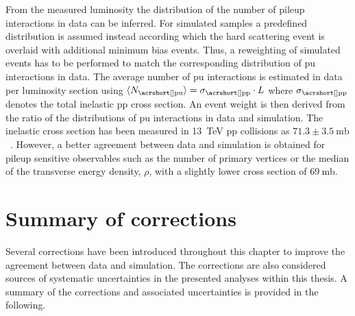From the measured luminosity the distribution of the number of pileup interactions in data can be inferred. For simulated samples a predefined distribution is assumed instead according which the hard scattering event is overlaid with additional minimum bias events. Thus, a reweighting of simulated events has to be performed to match the corresponding distribution of \gls{pu} interactions in data. 
The average number of \gls{pu} interactions is estimated in data per luminosity section using $\langle N_\mathrm{\gls{pu}}\rangle=\sigma_\mathrm{\gls{pp}}\cdot L$ where $\sigma_\mathrm{\gls{pp}}$ denotes the total inelastic \gls{pp} cross section. An event weight is then derived from the ratio of the distributions of \gls{pu} interactions in data and simulation. The inelastic cross section has been measured in 13~TeV \gls{pp} collisions as $71.3\pm3.5~\mathrm{mb}$~\cite{CMS-PAS-FSQ-15-005}. However, a better agreement between data and simulation is obtained for pileup sensitive observables such as the number of primary vertices or the median of the transverse energy density, $\rho$, with a slightly lower cross section of $69~\mathrm{mb}$.


\section{Summary of corrections}
\label{sec:reconstruction-summary}

Several corrections have been introduced throughout this chapter to improve the agreement between data and simulation. The corrections are also considered sources of systematic uncertainties in the presented analyses within this thesis. A summary of the corrections and associated uncertainties is provided in the following.


